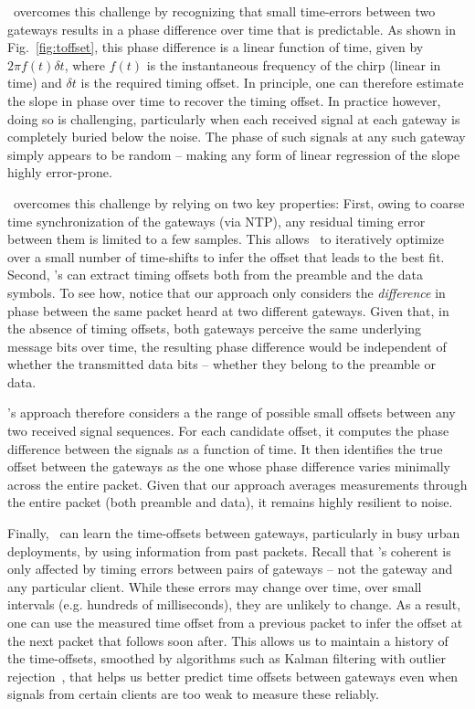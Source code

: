 \name\ overcomes this challenge by recognizing that small time-errors between two gateways results in a phase difference over time that is predictable. As shown in Fig.~\ref{fig:toffset}, this phase difference is a linear function of time, given by $2\pi f(t) \delta t$, where $f(t)$ is the instantaneous frequency of the chirp (linear in time) and $\delta t$ is the required timing offset. In principle, one can therefore estimate the slope in phase over time to recover the timing offset. In practice however, doing so is challenging, particularly when each received signal at each gateway is completely buried below the noise. The phase of such signals at any such gateway simply appears to be random -- making any form of linear regression of the slope highly error-prone.

\name\ overcomes this challenge by relying on two key properties: First, owing to coarse time synchronization of the gateways (via NTP), any residual timing error between them is limited to a few samples. This allows \name\ to iteratively optimize over a small number of time-shifts to infer the offset that leads to the best fit. Second, \name's can extract timing offsets both from the preamble and the data symbols. To see how, notice that our approach only considers the {\it difference} in phase between the same packet heard at two different gateways. Given that, in the absence of timing offsets, both gateways perceive the same underlying message bits over time, the resulting phase difference would be independent of whether the transmitted data bits -- whether they belong to the preamble or data. 

\name's approach therefore considers a the range of possible small offsets between any two received signal sequences. For each candidate offset, it computes the phase difference between the signals as a function of time. It then identifies the true offset between the gateways as the one whose phase difference varies minimally across the entire packet. Given that our approach averages measurements through the entire packet (both preamble and data), it remains highly resilient to noise.\vspace*{0.1in}


 Finally, \name\ can learn the time-offsets between gateways, particularly in busy urban deployments, by using information from past packets. Recall that \name's coherent is only affected by timing errors between pairs of gateways -- not the gateway and any particular client. While these errors may change over time, over small intervals (e.g. hundreds of milliseconds), they are unlikely to change. As a result, one can use the measured time offset from a previous packet to infer the offset at the next packet that follows soon after. This allows us to maintain a history of the time-offsets, smoothed by algorithms such as Kalman filtering with outlier rejection~\cite{}, that helps us better predict time offsets between gateways even when signals from certain clients are too weak to measure these reliably. 



